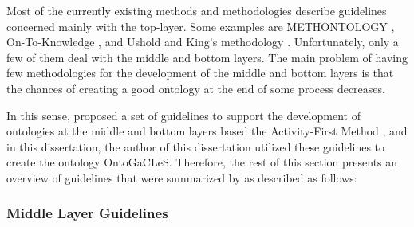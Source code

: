 Most of the currently existing methods and methodologies describe guidelines concerned mainly with the top-layer.
Some examples are METHONTOLOGY \cite{Fernandez-LopezGomez-PerezJuristo1997}, On-To-Knowledge \cite{SureStaabStuder2004}, and Ushold and King's methodology \cite{UscholdKing1995}.
Unfortunately, only a few of them deal with the middle and bottom layers. 
The main problem of having few methodologies for the development of the middle and bottom layers is that the chances of creating a good ontology at the end of some process decreases.

In this sense,  proposed a set of guidelines to support the development of ontologies at the middle and bottom layers based the Activity-First Method \cite{Mizoguchi1995}, and in this dissertation, the author of this dissertation utilized these guidelines to create the ontology OntoGaCLeS.
Therefore, the rest of this section presents an overview of guidelines \cite{Mizoguchi2003,Mizoguchi2004a,Mizoguchi2004} that were summarized by  as described as follows:

\subsubsection*{Middle Layer Guidelines}
\label{subsubsec:middle-layer}

